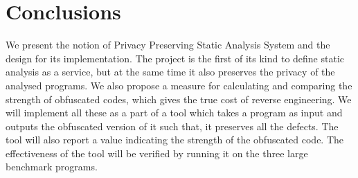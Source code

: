 \documentclass[twocolumn]{article}
\begin{document}
\section{Conclusions}
We present the notion of Privacy Preserving Static Analysis System and the design for its implementation. The project is the first of its kind to define static analysis as a service, 
but at the same time it also preserves the privacy of the analysed programs. We also propose a measure for calculating and comparing the strength of obfuscated codes, which gives the 
true cost of reverse engineering. We will implement all these as a part of a tool which takes a program as input and outputs the obfuscated version of it such that, it preserves all 
the defects. The tool will also report a value indicating the strength of the obfuscated code. The effectiveness of the tool will be verified by running it on the three large benchmark 
programs.


\end{document}
